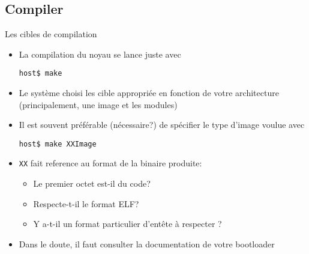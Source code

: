 \subsection{Compiler}
\begin{frame}[fragile=singleslide]{Les cibles de compilation}
  \begin{itemize} 
  \item  La compilation  du noyau  se lance  juste avec 
    \begin{lstlisting} 
host$ make
    \end{lstlisting} 
  \item Le  système choisi les  cible appropriée en fonction  de votre
    architecture (principalement, une image et les modules)
   \item Il est souvent  préférable (nécessaire?) de spécifier le type
     d'image voulue avec
    \begin{lstlisting}
host$ make XXImage
    \end{lstlisting}
  \item \verb+XX+ fait reference au format de la binaire produite:
    \begin{itemize}
    \item Le premier octet est-il du code?
    \item Respecte-t-il le format ELF?
    \item Y a-t-il un format particulier d'entête à respecter ?
    \end{itemize}
  \item Dans  le doute,  il faut consulter  la documentation  de votre
    bootloader
  \end{itemize}
\end{frame} 

